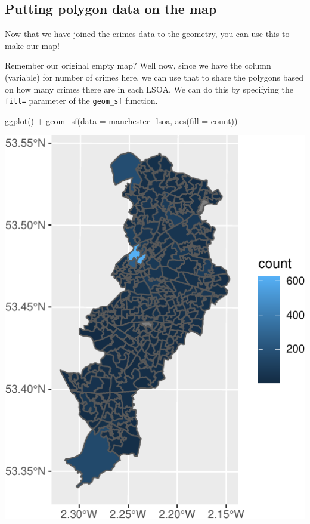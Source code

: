 \documentclass[
]{book}
\makeatletter
\newenvironment{Shaded}{\begin{snugshade}}{\end{snugshade}}
\newcommand{\AttributeTok}[1]{\textcolor[rgb]{0.61,0.61,0.61}{#1}}
\newcommand{\FunctionTok}[1]{\textcolor[rgb]{0,0,0}{#1}}
\newcommand{\NormalTok}[1]{#1}
\newcommand{\SpecialCharTok}[1]{\textcolor[rgb]{0,0,0}{#1}}
\newenvironment{kframe}{%
\medskip{}
\setlength{\fboxsep}{.8em}
 \def\at@end@of@kframe{}%
 \ifinner\ifhmode%
  \def\at@end@of@kframe{\end{minipage}}%
  \begin{minipage}{\columnwidth}%
 \fi\fi%
 \def\FrameCommand##1{\hskip\@totalleftmargin \hskip-\fboxsep
 \colorbox{shadecolor}{##1}\hskip-\fboxsep
     \hskip-\linewidth \hskip-\@totalleftmargin \hskip\columnwidth}%
 \MakeFramed {\advance\hsize-\width
   \@totalleftmargin\z@ \linewidth\hsize
   \@setminipage}}%
 {\par\unskip\endMakeFramed%
 \at@end@of@kframe}
\renewenvironment{Shaded}{\begin{kframe}}{\end{kframe}}
\makeatother
\begin{document}
\hypertarget{putting-polygon-data-on-the-map}{%
\subsection{Putting polygon data on the map}\label{putting-polygon-data-on-the-map}}

Now that we have joined the crimes data to the geometry, you can use this to make our map!

Remember our original empty map? Well now, since we have the column (variable) for number of crimes here, we can use that to share the polygons based on how many crimes there are in each LSOA. We can do this by specifying the \texttt{fill=} parameter of the \texttt{geom\_sf} function.

\begin{Shaded}
\begin{Highlighting}[]
\FunctionTok{ggplot}\NormalTok{() }\SpecialCharTok{+} 
\FunctionTok{geom\_sf}\NormalTok{(}\AttributeTok{data =}\NormalTok{ manchester\_lsoa, }\FunctionTok{aes}\NormalTok{(}\AttributeTok{fill =}\NormalTok{ count))}
\end{Highlighting}
\end{Shaded}

\includegraphics{crime_mapping_files/figure-latex/unnamed-chunk-30-1.pdf}
\end{document}
